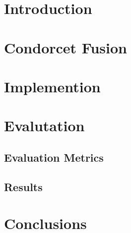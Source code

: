 
	
	\printTitle
	\newpage
	\tableofcontents
	\newpage
	\section{Introduction}
	\section{Condorcet Fusion}
	\section{Implemention}
	\section{Evalutation}
		  
		\subsection{Evaluation Metrics}
			
		\subsection{Results}
	\section{Conclusions}
	

